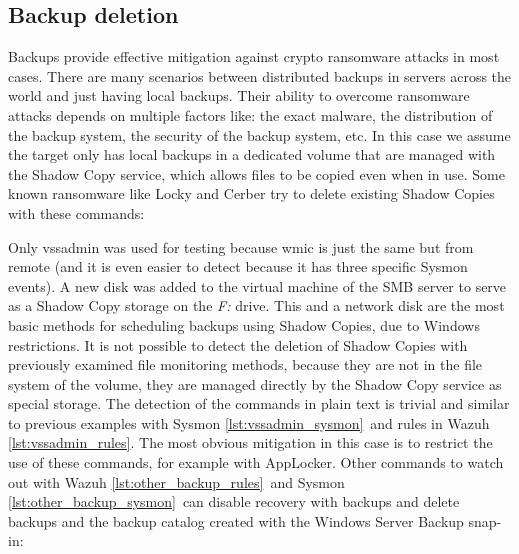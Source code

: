 \subsection{Backup deletion}
Backups provide effective mitigation against crypto ransomware attacks in most cases.
There are many scenarios between distributed backups in servers across the world and just having local backups.
Their ability to overcome ransomware attacks depends on multiple factors like: the exact malware, the distribution of the backup system, the security of the backup system, etc.
\linej
In this case we assume the target only has local backups in a dedicated volume that are managed with the Shadow Copy service, which allows files to be copied even when in use.
Some known ransomware like Locky and Cerber try to delete existing Shadow Copies with these commands\cite{ransomware_oReilly}:

\linej
Only vssadmin was used for testing because wmic is just the same but from remote (and it is even easier to detect because it has three specific Sysmon events).
A new disk was added to the virtual machine of the SMB server to serve as a Shadow Copy storage on the \textit{F:} drive.
This and a network disk are the most basic methods for scheduling backups using Shadow Copies, due to Windows restrictions.
\linej
\linej
It is not possible to detect the deletion of Shadow Copies with previously examined file monitoring methods, because they are not in the file system of the volume, they are managed directly by the Shadow Copy service as special storage.
\linej
The detection of the commands in plain text is trivial and similar to previous examples with Sysmon \ref{lst:vssadmin_sysmon}\ and rules in Wazuh \ref{lst:vssadmin_rules}.
\linej
The most obvious mitigation in this case is to restrict the use of these commands, for example with AppLocker.
\linej
\linej
Other commands to watch out with Wazuh \ref{lst:other_backup_rules}\ and Sysmon \ref{lst:other_backup_sysmon}\ can disable recovery with backups and delete backups and the backup catalog created with the Windows Server Backup snap-in\cite{wannacry_IOCS_details}\cite{wbadmin}:


